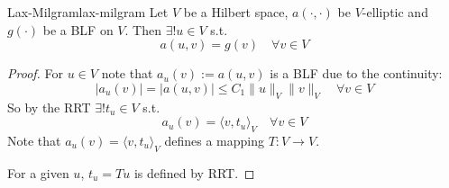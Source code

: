 \begin{theorem}{Lax-Milgram}{lax-milgram}
    Let $V$ be a Hilbert space, $a(\cdot, \cdot)$ be $V$-elliptic and $g(\cdot)$ be a BLF on $V$. Then $\exists! u \in V$ s.t.
    \[
        a(u, v) = g(v) \quad \forall v \in V
    \]
\end{theorem}
\begin{proof}
    For $u \in V$ note that $a_u(v) := a(u, v)$ is a BLF due to the continuity:
    \[
        |a_u(v)| = |a(u, v)| \leq C_1 \|u\|_V \|v\|_V \quad \forall v \in V
    \]
    So by the RRT $\exists! t_u \in V$ s.t.
    \[
        a_u(v) = \langle v, t_u \rangle_V \quad \forall v \in V
    \]
    Note that $a_u(v) = \langle v, t_u \rangle_V$ defines a mapping $T: V \to V$.

    For a given $u$, $t_u = T u$ is defined by RRT.


\end{proof}
